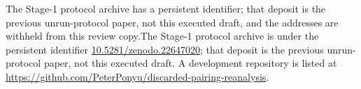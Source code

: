 \ifdefined\ANONYMOUS The Stage-1 protocol archive has a persistent identifier; that deposit is the previous unrun-protocol paper, not this executed draft, and the addresses are withheld from this review copy.\else The Stage-1 protocol archive is under the persistent identifier \href{https://doi.org/10.5281/zenodo.22647020}{10.5281/zenodo.22647020}; that deposit is the previous unrun-protocol paper, not this executed draft. A development repository is listed at \url{https://github.com/PeterPonyu/discarded-pairing-reanalysis}.\fi

